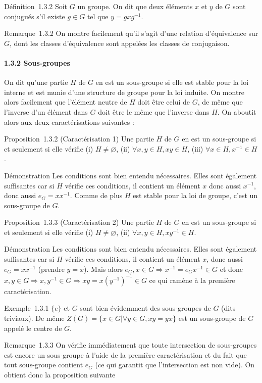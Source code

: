 Définition~1.3.2 Soit $G$ un groupe. On dit que deux éléments $x$ et $y$ de $G$
sont conjugués s'il existe $g \in G$ tel que $y = gxg^{-1}$.

Remarque~1.3.2 On montre facilement qu'il s'agit d'une relation
d'équivalence sur $G$, dont les classes d'équivalence sont appelées les
classes de conjugaison.

\paragraph{1.3.2 Sous-groupes}

On dit qu'une partie $H$ de $G$ en est un sous-groupe si elle est stable
pour la loi interne et est munie d'une structure de groupe pour la loi
induite. On montre alors facilement que l'élément neutre de $H$ doit être
celui de $G$, de même que l'inverse d'un élément dans $G$ doit être le même
que l'inverse dans $H$. On aboutit alors aux deux caractérisations
suivantes :

Proposition~1.3.2 (Caractérisation 1) Une partie $H$ de $G$ en est un
sous-groupe si et seulement si elle vérifie (i)
$H \neq \varnothing$, (ii) $\forall x,y \in H,
xy \in H$, (iii) $\forall x \in H, x^{-1} \in H$.

Démonstration Les conditions sont bien entendu nécessaires. Elles sont
également suffisantes car si $H$ vérifie ces conditions, il contient un
élément $x$ donc aussi $x^{-1}$, donc aussi $e_G =
xx^{-1}$. Comme de plus $H$ est stable pour la loi de groupe,
c'est un sous-groupe de $G$.

Proposition~1.3.3 (Caractérisation 2) Une partie $H$ de $G$ en est un
sous-groupe si et seulement si elle vérifie (i)
$H \neq \varnothing$, (ii) $\forall x,y \in H,
xy^{-1} \in H$.

Démonstration Les conditions sont bien entendu nécessaires. Elles sont
également suffisantes car si $H$ vérifie ces conditions, il contient un
élément $x$, donc aussi $e_G = xx^{-1}$ (prendre $y = x$).
Mais alors $e_G, x \in G \Rightarrow x^{-1} =
e_G x^{-1} \in G$ et donc $x,y \in G \Rightarrow x,y^{-1} \in G
\Rightarrow xy = x(y^{-1})^{-1} \in G$ ce qui ramène à la première
caractérisation.

Exemple~1.3.1 $\{e\}$ et $G$ sont bien
évidemment des sous-groupes de $G$ (dits triviaux). De même $Z(G) =
\{x \in G | \forall y \in G, xy = yx\}$ est un sous-groupe de $G$ appelé le centre de $G$.

Remarque~1.3.3 On vérifie immédiatement que toute intersection de
sous-groupes est encore un sous-groupe à l'aide de la première
caractérisation et du fait que tout sous-groupe contient $e_G$
(ce qui garantit que l'intersection est non vide). On obtient donc la
proposition suivante

